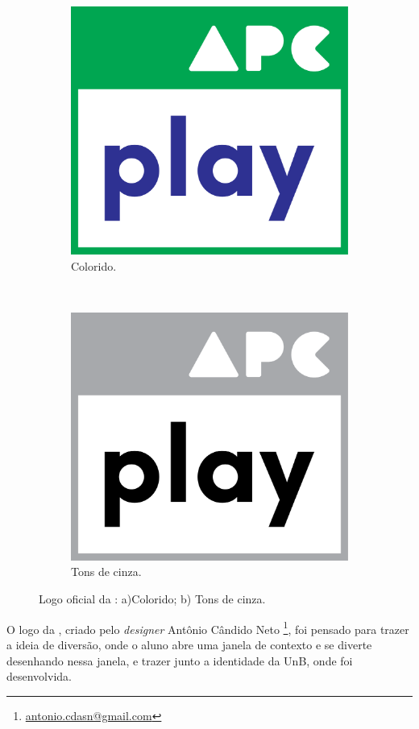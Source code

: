 \label{appendix:logo}

\begin{figure}[H]
  \centering
  \begin{subfigure}[t]{.45\textwidth}
    \includegraphics[width=.9\textwidth]{../img/playapc_color_big}
    \caption{Colorido.} 
  \end{subfigure}
  ~
  \begin{subfigure}[t]{0.45\textwidth}
    \includegraphics[width=.9\textwidth]{../img/playapc_grey_big}
    \caption{Tons de cinza.} 
  \end{subfigure}
  \label{fig:logo}
  \caption{Logo oficial da \playAPC: a)Colorido; b) Tons de cinza.} 
\end{figure}

O logo da \playAPC{}, criado pelo \emph{designer} Antônio Cândido Neto \footnote{\href{mailto:antonio.cdasn@gmail.com}{antonio.cdasn@gmail.com}}, foi pensado para trazer a ideia de diversão, onde o aluno abre uma janela de contexto e se diverte desenhando nessa janela, e trazer junto a identidade da \acrshort{UnB}, onde foi desenvolvida.